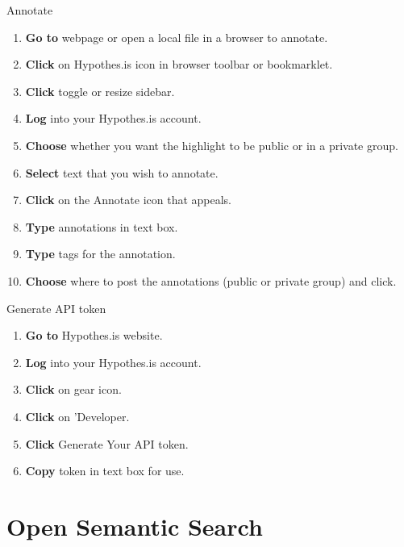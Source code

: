 \documentclass[10pt,a4paper]{article}
\begin{document}
\begin{textbox}{Annotate}
 

  

\begin{enumerate}
\item \textbf{Go to} webpage or open a local file in a browser to annotate. 
\item \textbf{Click} on Hypothes.is icon in browser toolbar or bookmarklet.
\item \textbf{Click} toggle or resize sidebar.
\item \textbf{Log} into your Hypothes.is account.
\item \textbf{Choose} whether you want the highlight to be public or in a private group.
\item \textbf{Select} text that you wish to annotate.
\item \textbf{Click} on the Annotate icon that appeals.
\item \textbf{Type} annotations in text box.
\item \textbf{Type} tags for the annotation.
\item \textbf{Choose} where to post the annotations (public or private group) and click. 

\end{enumerate}

\end{textbox}


\begin{textbox}{Generate API token}
 

  

\begin{enumerate}
\item \textbf{Go to} Hypothes.is website. 
\item \textbf{Log} into your Hypothes.is account.
\item \textbf{Click} on gear icon.
\item \textbf{Click} on 'Developer.
\item \textbf{Click} Generate Your API token.
\item \textbf{Copy} token in text box for use.

\end{enumerate}

\end{textbox}


\section{Open Semantic Search}
\end{document}
